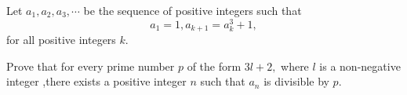 Let $a_1,a_2,a_3,\cdots$ be the sequence of positive integers such that $$a_1=1

, a_{k+1}=a^3_k+1, $$for all positive integers $k.$

Prove that for every prime number $p$ of the form $3l +2,$ where $l$ is a  non-negative integer ,there exists a  positive integer $n$ such that $a_n$ is divisible by $p.$